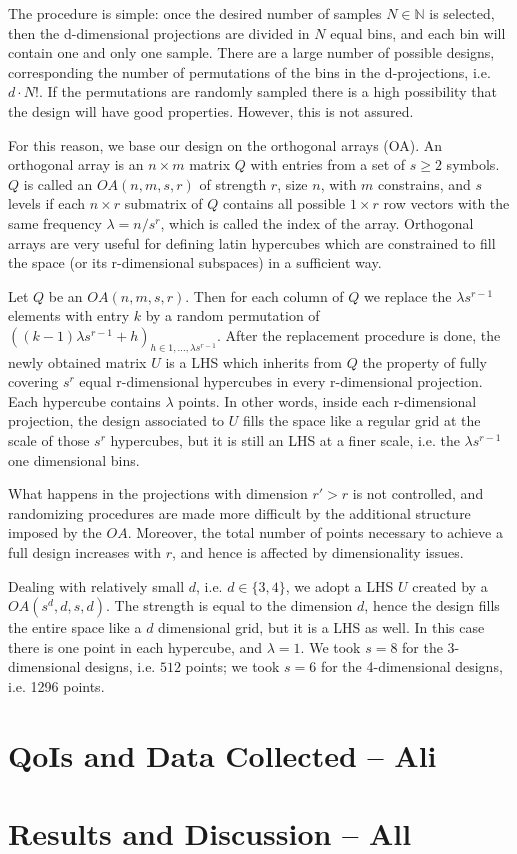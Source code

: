 \documentclass{article}
\begin{document}
The procedure is simple: once the desired number of samples $N\in\mathbb N$ is selected, then the d-dimensional projections are divided in $N$ equal bins, and each bin will contain one and only one sample. There are a large number of possible designs, corresponding the number of permutations of the bins in the d-projections, i.e. $d\cdot N!$. If the permutations are randomly sampled there is a high possibility that the design will have good properties. However, this is not assured.

For this reason, we base our design on the orthogonal arrays (OA). An orthogonal array is an $n\times m$ matrix $Q$ with entries from a set of $s\ge 2 $ symbols. $Q$ is called an $OA(n,m,s,r)$ of strength $r$, size $n$, with $m$ constrains, and $s$ levels if each $n\times r$ submatrix of $Q$ contains all possible $1\times r$ row vectors with the same frequency $\lambda=n/s^r$, which is called the index of the array. Orthogonal arrays are very useful for defining latin hypercubes which are constrained to fill the space (or its r-dimensional subspaces) in a sufficient way.

Let $Q$ be an $OA(n,m,s,r)$. Then for each column of $Q$ we replace the $\lambda s^{r-1}$ elements with entry $k$ by a random permutation of $\left((k-1)\lambda s^{r-1} + h\right)_{h\in 1,\dots, \lambda s^{r-1}}$. After the replacement procedure is done, the newly obtained matrix $U$ is a LHS which inherits from $Q$ the property of fully covering $s^r$ equal r-dimensional hypercubes in every r-dimensional projection. Each hypercube contains $\lambda$ points. In other words, inside each r-dimensional projection, the design associated to $U$ fills the space like a regular grid at the scale of those $s^r$ hypercubes, but it is still an LHS at a finer scale, i.e. the $\lambda s^{r-1}$ one dimensional bins.

What happens in the projections with dimension $r'>r$ is not controlled, and randomizing procedures are made more difficult by the additional structure imposed by the $OA$. Moreover, the total number of points necessary to achieve a full design increases with $r$, and hence is affected by dimensionality issues.

Dealing with relatively small $d$, i.e. $d\in\{3,4\}$, we adopt a LHS $U$ created by a $OA(s^d,d,s,d)$. The strength is equal to the dimension $d$, hence the design fills the entire space like a $d$ dimensional grid, but it is a LHS as well. In this case there is one point in each hypercube, and $\lambda=1$. We took $s=8$ for the 3-dimensional designs, i.e. $512$ points; we took $s=6$ for the 4-dimensional designs, i.e. 1296 points.

\section{QoIs and Data Collected -- Ali}
\section{Results and Discussion -- All}

\newpage


\end{document}
